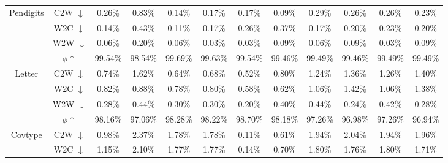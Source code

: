 \begin{table}[t]
{\begin{tabular}{c|c|cc|cc|cc|cc|cc}
\multirow{4}{*}{Pendigits}                   & C2W $\downarrow$                    & 0.26\%      & 0.83\%      & 0.14\%     & 0.17\%      & 0.17\%             & 0.09\%              & 0.29\%       & 0.26\%        & 0.26\%     & 0.23\%      \\
                                             & W2C $\downarrow$                    & 0.14\%      & 0.43\%      & 0.11\%     & 0.17\%      & 0.26\%             & 0.37\%              & 0.17\%       & 0.20\%        & 0.23\%     & 0.20\%      \\
                                             & W2W $\downarrow$                    & 0.06\%      & 0.20\%      & 0.06\%     & 0.03\%      & 0.03\%             & 0.09\%              & 0.06\%       & 0.09\%        & 0.03\%     & 0.09\%      \\
                                             & $\phi \uparrow$                  & 99.54\%     & 98.54\%     & 99.69\%    & 99.63\%     & 99.54\%            & 99.46\%             & 99.49\%      & 99.46\%       & 99.49\%    & 99.49\%     \\\midrule
\multirow{4}{*}{Letter}                      & C2W $\downarrow$                    & 0.74\%      & 1.62\%      & 0.64\%     & 0.68\%      & 0.52\%             & 0.80\%              & 1.24\%       & 1.36\%        & 1.26\%     & 1.40\%      \\
                                             & W2C $\downarrow$                    & 0.82\%      & 0.88\%      & 0.78\%     & 0.80\%      & 0.58\%             & 0.62\%              & 1.06\%       & 1.42\%        & 1.06\%     & 1.38\%      \\
                                             & W2W $\downarrow$                    & 0.28\%      & 0.44\%      & 0.30\%     & 0.30\%      & 0.20\%             & 0.40\%              & 0.44\%       & 0.24\%        & 0.42\%     & 0.28\%      \\
                                             & $\phi \uparrow$                  & 98.16\%     & 97.06\%     & 98.28\%    & 98.22\%     & 98.70\%            & 98.18\%             & 97.26\%      & 96.98\%       & 97.26\%    & 96.94\%     \\\midrule
\multirow{4}{*}{Covtype}                     & C2W $\downarrow$                    & 0.98\%      & 2.37\%      & 1.78\%     & 1.78\%      & 0.11\%             & 0.61\%              & 1.94\%       & 2.04\%        & 1.94\%     & 1.96\%      \\
                                             & W2C $\downarrow$                    & 1.15\%      & 2.10\%      & 1.77\%     & 1.77\%      & 0.14\%             & 0.70\%              & 1.80\%       & 1.76\%        & 1.80\%     & 1.71\%      \\

\end{tabular}}
\end{table}
